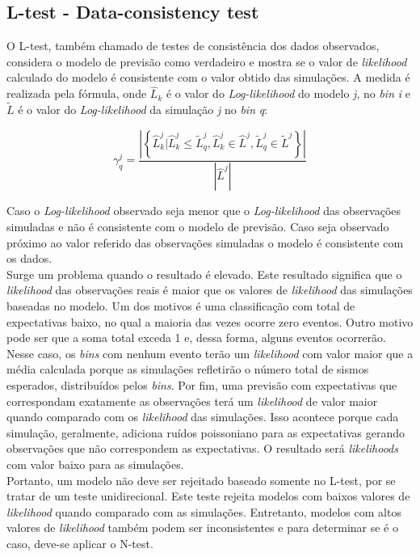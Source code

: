 \subsection{L-test - Data-consistency test}
O L-test, também chamado de testes de consistência dos dados observados, considera o modelo de previsão como verdadeiro e mostra se o valor de {\it likelihood} calculado do modelo é consistente com o valor obtido das simulações. A medida é realizada pela fórmula, onde $\widehat{L}_k$ é o valor do {\it Log-likelihood} do modelo {\it j}, no {\it bin} {\it i} e $\widetilde{L}$ é o valor do {\it Log-likelihood} da simulação {\it j} no {\it bin} {\it q}: 


\begin{equation}
\gamma^{j}_{q} = \frac{\left| \left\{ \widehat{L}^j_k | \widehat{L}^j_k \leq \widetilde{L}^j_q, \widehat{L}^j_k \in \widehat{L}^j, \widetilde{L}^j_q \in \widetilde{L}^j  \right\} \right|}  {|\widehat{L}^j|}
\end{equation}


Caso o {\it Log-likelihood} observado seja menor que o {\it Log-likelihood} das observações simuladas e não é consistente com o modelo de previsão. Caso seja observado próximo ao valor referido das observações simuladas o modelo é consistente com os dados.\\

Surge um problema quando o resultado é elevado. Este resultado significa que o {\it likelihood} das observações reais é maior que os valores de {\it likelihood} das simulações baseadas no modelo. Um dos motivos é uma classificação com total de expectativas baixo, no qual a maioria das vezes ocorre zero eventos. Outro motivo pode ser que a soma total exceda 1 e, dessa forma, alguns eventos ocorrerão. Nesse caso, os {\it bins} com nenhum evento terão um {\it likelihood} com valor maior que a média calculada porque as simulações refletirão o número total de sismos esperados, distribuídos pelos {\it bins}. Por fim, uma previsão com expectativas que correspondam exatamente as observações terá um {\it likelihood} de valor maior quando comparado com os {\it likelihood} das simulações. Isso acontece porque cada simulação, geralmente, adiciona ruídos poissoniano para as expectativas gerando observações que não correspondem as expectativas. O resultado será {\it likelihoods} com valor baixo para as simulações.\\

Portanto, um modelo não deve ser rejeitado baseado somente no L-test, por se tratar de um teste unidirecional. Este teste rejeita modelos com baixos valores de {\it likelihood} quando comparado com as simulações. Entretanto, modelos com altos valores de {\it likelihood} também podem ser inconsistentes e para determinar se é o caso, deve-se aplicar o N-test.\\
